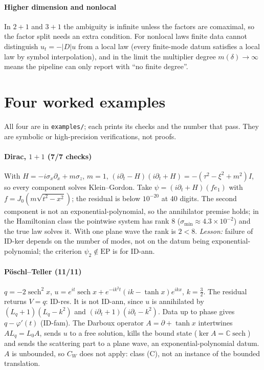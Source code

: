 \paragraph{Higher dimension and nonlocal} In $2{+}1$ and $3{+}1$ the ambiguity is infinite unless the factors are comaximal, so the factor split needs an extra condition. For nonlocal laws finite data cannot distinguish $u_t=-\lvert D\rvert u$ from a local law (every finite-mode datum satisfies a local law by symbol interpolation), and in the limit
the multiplier degree $m(\delta)\to\infty$ means the pipeline can only report \UND{} with ``no finite degree''.



\section{Four worked examples}\label{sec:examples}
All four are in \texttt{examples/}; each prints its checks and the number that pass. They are symbolic or high-precision verifications, not proofs.

\paragraph{Dirac, $1{+}1$ (7/7 checks)} With $H=-i\sigma_x\partial_x+m\sigma_z$, $m=1$, $(i\partial_t-H)(i\partial_t+H)=-(\tau^2-\xi^2+m^2)I$, so every component solves Klein--Gordon. Take $\psi=(i\partial_t+H)(fe_1)$ with $f=J_0(m\sqrt{t^2-x^2})$; the residual is below $10^{-20}$ at 40 digits.
The second component is not an exponential-polynomial, so the annihilator premise holds; in the Hamiltonian class the pointwise system has rank $8$ ($\sigma_{\min}\approx4.3\times10^{-2}$) and the true law solves it. With one plane wave the rank is $2<8$.
\emph{Lesson:} failure of ID-ker depends on the number of modes, not on the datum being exponential-polynomial; the criterion $\psi_2\notin\mathrm{EP}$ is for ID-ann.

\paragraph{P\"oschl--Teller (11/11)} $q=-2\operatorname{sech}^2x$, $u=e^{it}\operatorname{sech}x+e^{-ik^2t}(ik-\tanh x)e^{ikx}$, $k=\tfrac32$. The residual returns $V=q$: ID-res. It is not ID-ann, since $u$ is annihilated by $(L_q+1)(L_q-k^2)$ and $(i\partial_t+1)(i\partial_t-k^2)$.
Data up to phase gives $q-\varphi'(t)$ (ID-fam). The Darboux operator $A=\partial+\tanh x$ intertwines $A L_q=L_0A$, sends $u$ to a free solution, kills the bound state ($\ker A=\mathbb C\operatorname{sech}$) and sends the scattering part to a plane wave, an exponential-polynomial datum. $A$ is unbounded, so $C_W$ does not apply: class (C), not an instance of the bounded translation.


